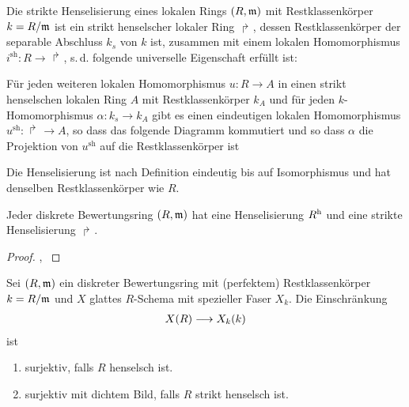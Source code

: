 \documentclass[german]{scrreprt}
\begin{document}
\begin{Definition}\label{def:striktehenselisierung}
  Die strikte Henselisierung eines lokalen Rings $(R,\mathfrak{m})$ mit
  Restklassenkörper $k=R/\mathfrak{m}$ ist ein strikt henselscher lokaler Ring
  $\Rsh$, dessen Restklassenkörper der separable Abschluss $k_s$ von
  $k$ ist, zusammen mit einem lokalen Homomorphismus
  $i^\text{sh}\colon R\to\Rsh$, s.\,d. folgende universelle
  Eigenschaft erfüllt ist:
  
  Für jeden weiteren lokalen Homomorphismus $u\colon R\to A$ in einen
  strikt henselschen lokalen Ring $A$ mit Restklassenkörper $k_A$ und
  für jeden $k$-Homomorphismus $\alpha\colon k_s\to k_A$ gibt es einen
  eindeutigen lokalen Homomorphismus $u^\text{sh}\colon\Rsh\to A$, so
  dass das folgende Diagramm kommutiert und so dass $\alpha$ die
  Projektion von $u^\text{sh}$ auf die Restklassenkörper ist
  \begin{center}
  \end{center}

  Die Henselisierung ist nach Definition eindeutig bis auf
  Isomorphismus und hat denselben Restklassenkörper wie $R$.
\end{Definition}

\begin{Satz}\label{thm:exhenselisierung}
  Jeder diskrete Bewertungsring $(R,\mathfrak{m})$ hat eine Henselisierung $R^{\text{h}}$
  und eine strikte Henselisierung $\Rsh$.
  \cite[Proposition IV.6.5]{silverman2}
  \begin{proof}
    \cite[Proposition IV.6.5]{silverman2},
    \cite[Remark IV.6.6.2]{silverman2}
    \cite[Chapter 2.3, S. 48]{neron}
  \end{proof}
\end{Satz}

\begin{Satz}\label{thm:eigstrikthenselsch}
  Sei $(R,\mathfrak{m})$ ein diskreter Bewertungsring mit (perfektem)
  Restklassenkörper $k=R/\mathfrak{m}$ und $X$ glattes $R$-Schema mit spezieller
  Faser $X_k$.
  Die Einschränkung
  \begin{gather*}
    X(R)\longrightarrow X_k(k)
  \end{gather*}
  ist
  \begin{enumerate}[label=(\roman*)]
  \item surjektiv, falls $R$ henselsch ist.
  \item surjektiv mit dichtem Bild, falls $R$ strikt henselsch ist.
  \end{enumerate}
  \cite[Proposition IV.6.4]{silverman2}
\end{Satz}
\end{document}
